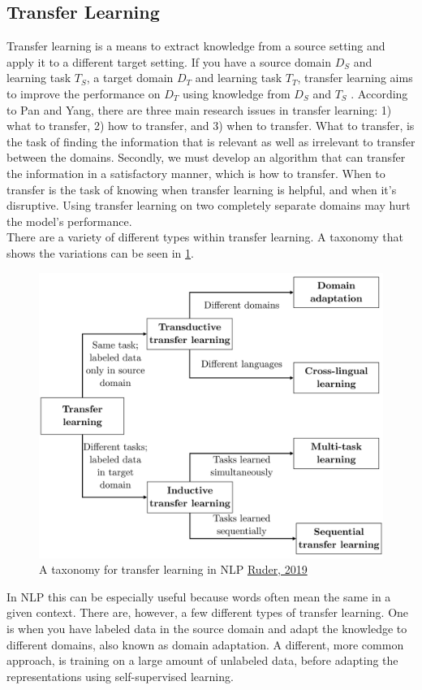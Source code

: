 \documentclass{report}
\begin{document}
\subsection{Transfer Learning}
Transfer learning is a means to extract knowledge from a source setting and apply it to a different target setting. If you have a source domain $D_S$ and learning task $T_S$, a target domain $D_T$ and learning task $T_T$, transfer learning aims to improve the performance on $D_T$ using knowledge from $D_S$ and $T_S$ \cite{5288526}. According to Pan and Yang, there are three main research issues in transfer learning: 1) what to transfer, 2) how to transfer, and 3) when to transfer. What to transfer, is the task of finding the information that is relevant as well as irrelevant to transfer between the domains. Secondly, we must develop an algorithm that can transfer the information in a satisfactory manner, which is how to transfer. When to transfer is the task of knowing when transfer learning is helpful, and when it's disruptive. Using transfer learning on two completely separate domains may hurt the model's performance\cite{5288526}.\\
There are a variety of different types within transfer learning. A taxonomy that shows the variations can be seen in \ref{fig:tltax}.
\begin{figure}[h!]
	\centering
	\includegraphics[scale=0.13]{img/tl_taxonomy}
	\caption{A taxonomy for transfer learning in NLP \href{ruder.io/thesis/neural_transfer_learning_for_nlp.pdf}{Ruder, 2019}}
	\label{fig:tltax}
\end{figure}%
In NLP this can be especially useful because words often mean the same in a given context. There are, however, a few different types of transfer learning. One is when you have labeled data in the source domain and adapt the knowledge to different domains, also known as domain adaptation. A different, more common approach, is training on a large amount of unlabeled data, before adapting the representations using self-supervised learning.
\end{document}
